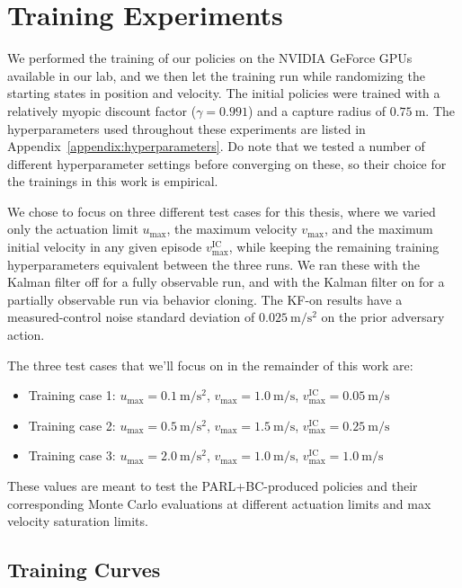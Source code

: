 \chapter{Training Experiments}


We performed the training of our policies on the NVIDIA GeForce GPUs available in our lab, and we then let the training run while randomizing the starting states in position and velocity. The initial policies were trained with a relatively myopic discount factor ($\gamma = 0.991$) and a capture radius of $0.75~\mathrm{m}$. The hyperparameters used throughout these experiments are listed in Appendix~\ref{appendix:hyperparameters}. Do note that we tested a number of different hyperparameter settings before converging on these, so their choice for the trainings in this work is empirical.


We chose to focus on three different test cases for this thesis, where we varied only the actuation limit $u_{\max}$, the maximum velocity $v_{\max}$, and the maximum initial velocity in any given episode $v_{\max}^{\mathrm{IC}}$, while keeping the remaining training hyperparameters equivalent between the three runs. We ran these with the Kalman filter off for a fully observable run, and with the Kalman filter on for a partially observable run via behavior cloning. The KF-on results have a measured-control noise standard deviation of $0.025~\mathrm{m/s^2}$ on the prior adversary action.

The three test cases that we'll focus on in the remainder of this work are:


\begin{itemize}
    \item Training case 1: $u_{\max} = 0.1~\mathrm{m/s^2}$, $v_{\max} = 1.0~\mathrm{m/s}$, $v_{\max}^{\mathrm{IC}} = 0.05~\mathrm{m/s}$
    \item Training case 2: $u_{\max} = 0.5~\mathrm{m/s^2}$, $v_{\max} = 1.5~\mathrm{m/s}$, $v_{\max}^{\mathrm{IC}} = 0.25~\mathrm{m/s}$
    \item Training case 3: $u_{\max} = 2.0~\mathrm{m/s^2}$, $v_{\max} = 1.0~\mathrm{m/s}$, $v_{\max}^{\mathrm{IC}} = 1.0~\mathrm{m/s}$
\end{itemize}

These values are meant to test the PARL+BC-produced policies and their corresponding Monte Carlo evaluations at different actuation limits and max velocity saturation limits.


\section{Training Curves}
\label{sec:Net_Training_Curves}
\label{sec:training-curves}

